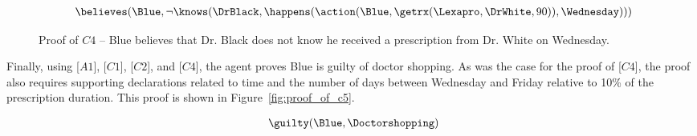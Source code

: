 \begin{footnotesize}
\begin{align*}
[C4] \ \believes(\Blue, \neg \knows(\DrBlack,\happens(\action(\Blue,\getrx(\Lexapro,\DrWhite,90)),\Wednesday)))
\end{align*}
\end{footnotesize}

\begin{figure}[h!] 
\vspace{6pt}
\centering
{}
\caption{Proof of $C4$ -- Blue believes that Dr. Black does not know he received a prescription from Dr. White on Wednesday.}
\label{fig:proof_of_c4}
\end{figure}


\noindent Finally, using [$A1$], [$C1$], [$C2$], and [$C4$], the agent proves Blue is guilty of doctor shopping.  As was the case for the proof of [$C4$], the proof also requires supporting declarations related to time and the number of days between Wednesday and Friday relative to 10\% of the prescription duration.  This proof is shown in Figure~\ref{fig:proof_of_c5}.
\begin{footnotesize}
\begin{align*}
[C5] \ \guilty(\Blue,\Doctorshopping)
\end{align*}
\end{footnotesize}


